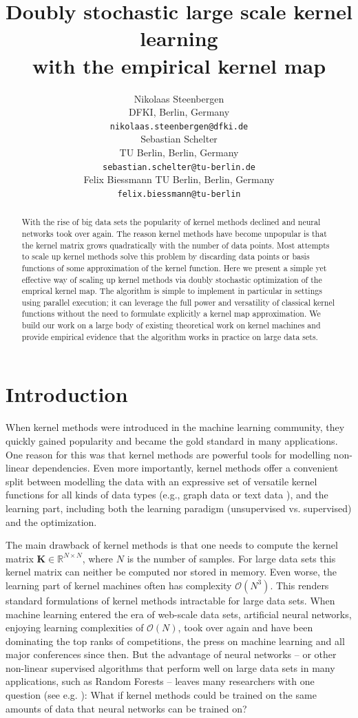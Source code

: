 \documentclass{article} %
\title{Doubly stochastic large scale kernel learning \\ with the empirical kernel map}
\author{
Nikolaas Steenbergen\\
DFKI, Berlin, Germany\\
\texttt{nikolaas.steenbergen@dfki.de}\\
\And
Sebastian Schelter\\
TU Berlin, Berlin, Germany\\
\texttt{sebastian.schelter@tu-berlin.de}\\
\And
Felix Biessmann
TU Berlin, Berlin, Germany\\
\texttt{felix.biessmann@tu-berlin}\\
}
\newcommand{\R}{\ensuremath{\mathds{R}}}
\renewcommand{\vec}[1]{\mathbf{#1}}
\begin{document}
\maketitle

\begin{abstract} 
With the rise of big data sets the popularity of kernel methods declined and neural networks took over again. The reason kernel methods have become unpopular is that the kernel matrix grows quadratically with the number of data points. Most attempts to scale up kernel methods  solve this problem by discarding data points or basis functions of some approximation of the kernel function. Here we present a simple yet effective way of scaling up kernel methods via doubly stochastic optimization of the emprical kernel map. The algorithm is simple to implement in particular in settings using parallel execution; it can leverage the full power and versatility of classical kernel functions without the need to formulate explicitly a kernel map approximation.
We build our work on a large body of existing theoretical work on kernel machines and provide empirical evidence that the algorithm works in practice on large data sets. 
\end{abstract} 


\section{Introduction\vspace{-0.1in}}
\indent When kernel methods \cite{Muller:2001p2592,shawe2004kernel} were introduced in the machine learning community, they quickly gained popularity and became the gold standard in many applications. One reason for this was that kernel methods are powerful tools for modelling non-linear dependencies. Even more importantly, kernel methods offer a convenient split between modelling the data with an expressive set of versatile kernel functions for all kinds of data types (e.g., graph data \cite{shawe2004kernel} or text data \cite{John2000}), and the learning part, including both the learning paradigm (unsupervised vs. supervised) and the optimization. 

The main drawback of kernel methods is that one needs to compute the kernel matrix $\vec{K}\in\R^{N\times N}$, where $N$ is the number of samples. For large data sets this kernel matrix can neither be computed nor stored in memory. Even worse, the learning part of kernel machines often has complexity $\mathcal{O}(N^3)$. This renders standard formulations of kernel methods intractable for large data sets. When machine learning entered the era of web-scale data sets, artificial neural networks, enjoying learning complexities of $\mathcal{O}(N)$, took over again and have been dominating the top ranks of competitions, the press on machine learning and all major conferences since then. But the advantage of neural networks -- or other non-linear supervised algorithms that perform well on large data sets in many applications, such as Random Forests \cite{Breiman2001} -- leaves many researchers with one question (see e.g. \cite{Lu2014}): What if kernel methods could be trained on the same amounts of data that neural networks can be trained on? 
\end{document}
